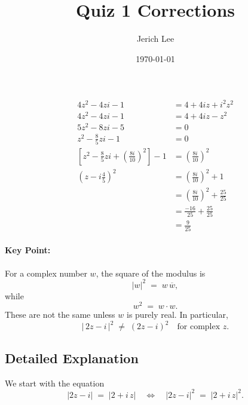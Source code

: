 \documentclass[12pt]{article}
\title{Quiz 1 Corrections}
\author{Jerich Lee}
\date{\today}
\theoremstyle{definition} %
\theoremstyle{plain} %
\begin{document}
\maketitle
\begin{align}
    4z^2 - 4z i - 1 &= 4 + 4i z + i^2 z^2 \\
    4z^2 - 4z i - 1 &= 4 + 4i z - z^2 \\
    5z^2 - 8z i - 5 &= 0 \\
    z^2 - \frac{8}{5} z i - 1 &= 0 \\
    \left[z^2 - \frac{8}{5} z i + \left(\frac{8i}{10}\right)^2 \right] - 1 &= \left(\frac{8i}{10}\right)^2 \\
    \left(z - i \frac{4}{5} \right)^2 &= \left(\frac{8i}{10}\right)^2 + 1 \\
    &= \left(\frac{8i}{10}\right)^2 + \frac{25}{25} \\
    &= \frac{-16}{25} + \frac{25}{25} \\
    &= \frac{9}{25}
    \end{align}

    \paragraph{Key Point:} For a complex number $w$, the square of the modulus is 
    \[
      |w|^2 \;=\; w\,\overline{w},
    \]
    while
    \[
      w^2 \;=\; w \cdot w.
    \]
    These are not the same unless $w$ is purely real. In particular,
    \[
      |\,2z - i\,|^2 
      \;\neq\; (2z - i)^2
      \quad\text{for complex }z.
    \]
    
    \subsection*{Detailed Explanation}
    
    We start with the equation
    \[
    \bigl\lvert 2z - i \bigr\rvert 
    \;=\; 
    \bigl\lvert 2 + i\,z \bigr\rvert
    \quad\Longleftrightarrow\quad
    \bigl\lvert 2z - i \bigr\rvert^2 
    \;=\; 
    \bigl\lvert 2 + i\,z \bigr\rvert^2.
    \]
    
\end{document}
